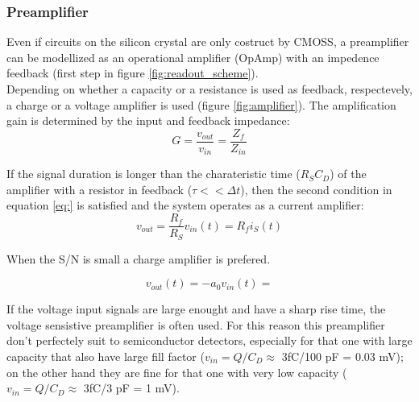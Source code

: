 \begin{titlepage}
\subsubsection{Preamplifier}
Even if circuits on the silicon crystal are only costruct by CMOSS, a
preamplifier can be modellized as an operational amplifier (OpAmp) with an impedence
feedback (first step in figure \ref{fig:readout_scheme}).\\
Depending on whether a capacity or a resistance is used as feedback, respectevely,
a charge or a voltage amplifier is used (figure \ref{fig:amplifier}).
The amplification gain is determined by the input and feedback impedance:
\begin{equation}
G = \frac{v_{out}}{v_{in}} = \frac{Z_{f}}{Z_{in}}
\end{equation}

If the signal duration is longer than the charateristic time ($R_SC_D$) of the amplifier with
a resistor in feedback ($\tau << \Delta t$), then the second condition in equation \ref{eq:} is satisfied
and the system operates as a current amplifier:
\begin{equation}
v_{out} = \frac{R_f}{R_S}v_{in}(t) = R_{f}i_{S}(t)
\end{equation}

When the S/N is small a charge amplifier is prefered.

\begin{equation}
v_{out}(t) = -a_{0}v_{in}(t) =

\end{equation}

If the voltage input signals are large enought and have a sharp rise time, the voltage
sensistive preamplifier is often used. For this reason this preamplifier don't
perfectely suit to semiconductor detectors, especially for that one with large capacity
that also have large fill factor ($v_{in} = Q/C_{D} \approx$ 3fC/100 pF = 0.03 mV); on the other hand they are fine for that one with
very low capacity ($v_{in} = Q/C_{D} \approx$ 3fC/3 pF = 1 mV).


\end{titlepage}
